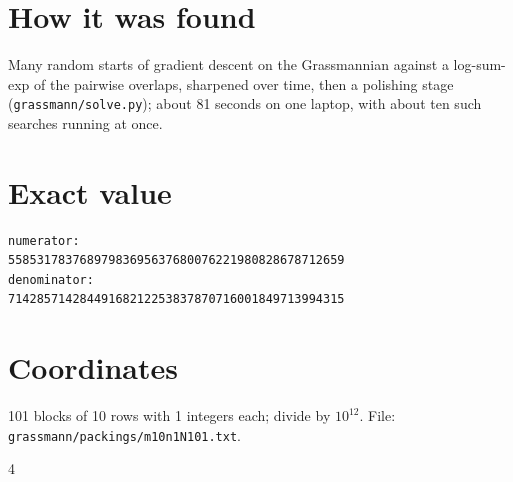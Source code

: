 \documentclass[11pt,a4paper]{article}
\begin{document}
\section{How it was found}
Many random starts of gradient descent on the Grassmannian against a log-sum-exp of the pairwise overlaps, sharpened over time, then a polishing stage (\texttt{grassmann/solve.py}); about 81 seconds on one laptop, with about ten such searches running at once.


\appendix
\section{Exact value}
{\small
\begin{verbatim}
numerator:
55853178376897983695637680076221980828678712659
denominator:
71428571428449168212253837870716001849713994315
\end{verbatim}}

\section{Coordinates}
101 blocks of 10 rows with 1 integers each; divide by $10^{12}$. File: \texttt{grassmann/packings/m10n1N101.txt}.
{\tiny
\begin{multicols}{4}
\end{multicols}}
\end{document}
